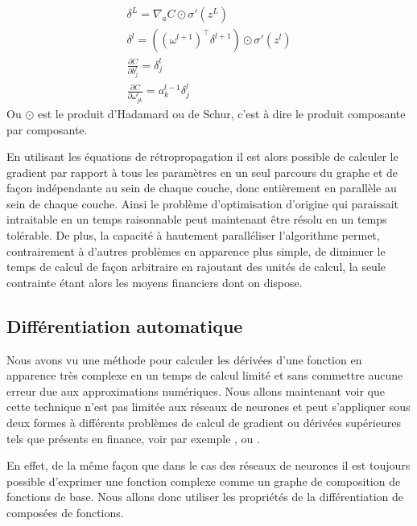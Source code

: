 \begin{theoreme}
    \begin{gather}
        \delta^L = \nabla_a C \odot \sigma' (z^L ) \\
        \delta^l = \left( \left( \omega^{l+1} \right)^\intercal \delta^{l+1} \right) \odot \sigma' ( z^l ) \\
        \frac{\partial C}{\partial b^l_j} = \delta^l_j \\
        \frac{\partial C}{\partial \omega^l_{jk}} = a^{l-1}_k \delta^l_j
    \end{gather}
    Ou $\odot$ est le produit d'Hadamard ou de Schur, c'est à dire le produit composante par composante.
\end{theoreme}


En utilisant les équations de rétropropagation il est alors possible de calculer le gradient par rapport à tous les paramètres en un seul parcours du graphe et de façon indépendante au sein de chaque couche, donc entièrement en parallèle au sein de chaque couche. Ainsi le problème d'optimisation d'origine qui paraissait intraitable en un temps raisonnable peut maintenant être résolu en un temps tolérable. De plus, la capacité à hautement paralléliser l'algorithme permet, contrairement à d'autres problèmes en apparence plus simple, de diminuer le temps de calcul de façon arbitraire en rajoutant des unités de calcul, la seule contrainte étant alors les moyens financiers dont on dispose.

\subsection{Différentiation automatique}

Nous avons vu une méthode pour calculer les dérivées d'une fonction en apparence très complexe en un temps de calcul limité et sans commettre aucune erreur due aux approximations numériques. Nous allons maintenant voir que cette technique n'est pas limitée aux réseaux de neurones et peut s'appliquer sous deux formes à différents problèmes de calcul de gradient ou dérivées supérieures tels que présents en finance, voir par exemple \citet{Homescu2011}, \citet{Giles2005} ou \citet{Xu2014}.

En effet, de la même façon que dans le cas des réseaux de neurones il est toujours possible d'exprimer une fonction complexe comme un graphe de composition de fonctions de base. Nous allons donc utiliser les propriétés de la différentiation de composées de fonctions.

